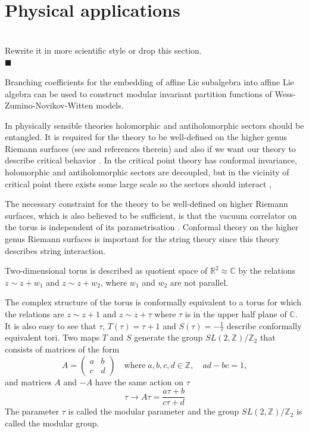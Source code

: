 \documentclass[a4paper,12pt]{article}
\theoremstyle{definition} \newtheorem{Def}{Definition}
\newenvironment{comment}
{\par\noindent{\bf TODO}\\}
{\\\hfill$\scriptstyle\blacksquare$\par}
\begin{document}
\section{Physical applications}
\label{sec:phys-appl}
\begin{comment}
  Rewrite it in more scientific style or drop this section.
\end{comment}
Branching coefficients for the embedding of affine Lie subalgebra into
affine Lie algebra can be used to construct modular invariant
partition functions of Wess-Zumino-Novikov-Witten models.

 In physically sensible theories holomorphic and antiholomorphic
 sectors should be entangled. It is required for the theory to be
 well-defined on the higher genus Riemann surfaces (see
 \cite{gaberdiel2000icf} and references therein) and also if we want
 our theory to describe critical behavior \cite{difrancesco1997cft}.
 In the critical point theory has conformal invariance, holomorphic
 and antiholomorphic sectors are decoupled, but in the vicinity of
 critical point there exists some large scale so the sectors should
 interact \cite{difrancesco1997cft}, 

The necessary constraint for the theory to be well-defined on higher Riemann surfaces, which is also believed to be sufficient, is that the vacuum correlator on the torus is independent of its parametrisation \cite{gaberdiel2000icf}. Conformal theory on the higher genus Riemann surfaces is important for the string theory since this theory describes string interaction.

Two-dimensional torus is described as quotient space of $\mathbb{R}^2\approx \mathbb{C}$ by the relations $z\sim z+w_1$ and $z\sim z+w_2$, where $w_1$ and $w_2$ are not parallel. 

The complex structure of the torus is conformally equivalent to a torus for which the relations are $z\sim z+1$ and $z\sim z+\tau$ where $\tau$ is in the upper half plane of $\mathbb{C}$. It is also easy to see that $\tau$, $T(\tau)=\tau+1$ and $S(\tau)=-\frac{1}{\tau}$ describe conformally equivalent tori. Two maps $T$ and $S$ generate the group $SL(2,\mathbb{Z})/\mathbb{Z}_2$ that consists of matrices of the form
\begin{equation}
  \label{eq:99}
  A=
  \begin{pmatrix}
    a & b\\
    c & d 
  \end{pmatrix}
  \quad\mbox{where}\; a,b,c,d\in\mathbb{Z},\quad ad-bc=1,
\end{equation}
and matrices $A$ and $-A$ have the same action on $\tau$
\begin{equation}
  \label{eq:100}
  \tau\to A\tau=\frac{a\tau+b}{c\tau+d}
\end{equation}
The parameter $\tau$ is called the modular parameter and the group  $SL(2,\mathbb{Z})/\mathbb{Z}_2$ is called the modular group. 
\end{document}
